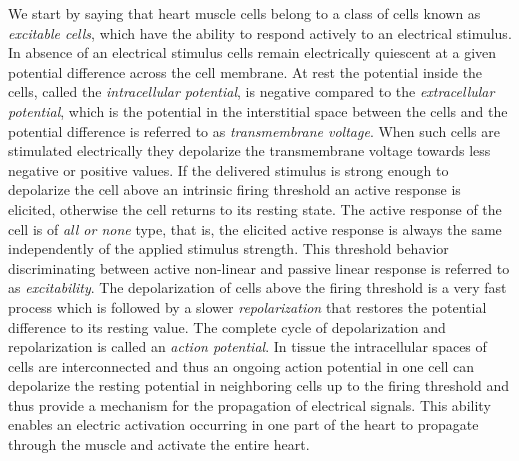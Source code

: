 \documentclass[10pt]{article}
\begin{document}
	We start by saying that heart muscle cells belong to a class of cells known as {\it excitable cells}, which
	have the ability to respond actively to an electrical stimulus. In absence of an electrical stimulus cells
	remain electrically quiescent at a given potential difference across the cell membrane. At rest the potential
	inside the cells, called the {\it intracellular potential}, is negative compared to the {\it extracellular potential},
	which is the potential in the interstitial space between the cells and the potential difference is referred to as
	{\it transmembrane voltage}. When such cells are stimulated electrically they depolarize the transmembrane
	voltage towards less negative or positive values. If the delivered stimulus is strong enough to depolarize the
	cell above an intrinsic firing threshold an active response is elicited, otherwise the cell returns to its resting
	state. The active response of the cell is of \emph{all or none} type, that is, the elicited active response is always
	the same independently of the applied stimulus strength. This threshold behavior discriminating between
	active non-linear and passive linear response is referred to as \emph{excitability}. The depolarization of cells
	above the firing threshold is a very fast process which is followed by a slower {\it repolarization} that restores
	the potential difference to its resting value. The complete cycle of depolarization and repolarization is
	called an {\it action potential}. In tissue the intracellular spaces of cells are interconnected and thus an
	ongoing action potential in one cell can depolarize the resting potential in neighboring cells up to the firing
	threshold and thus provide a mechanism for the propagation of electrical signals. This ability enables an
	electric activation occurring in one part of the heart to propagate through the muscle and activate the
	entire heart.
\end{document}
